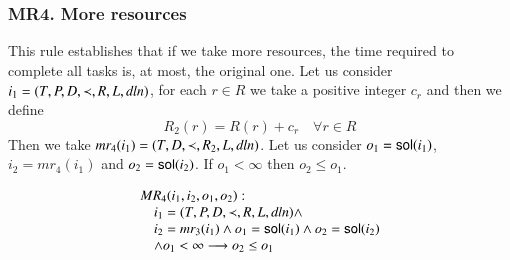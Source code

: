 












\subsubsection{MR4. More resources}
This rule establishes that if we take more resources, the
time required to complete all tasks is, at most, the original one.
Let us consider
$i_{1}=(T, P, D, \prec, R, L, \mathit{dln})$, for each $r\in R$ we take a
positive integer $c_{r}$ and then we define
\begin{displaymath}
  R_{2}(r)=R(r)+c_{r}\quad \forall r\in R
\end{displaymath}
Then we take $mr_{4}(i_{1}) = (T, D, \prec, R_{2}, L, \mathit{dln})$.
Let us
consider $o_{1}=\mathsf{sol}(i_{1})$, $i_{2}=mr_{4}(i_{1})$ and
$o_{2}=\mathsf{sol}(i_{2})$.
If $o_{1}<\infty$ then $o_{2}\leq o_{1}$.

\begin{framed}
  \begin{displaymath}
      \begin{array}{l}
    MR_{4}(i_1,i_2,o_{1},o_{2}):\\
      \hskip 1em  i_1=(T,P,D,\prec,R,L,\mathit{dln}) \wedge\\
      \hskip 1em  i_2=mr_3(i_1)\wedge o_{1}=\mathsf{sol}(i_{1})\wedge o_{2}=\mathsf{sol}(i_2)\\
      \hskip 1em \wedge o_{1}<\infty
      \longrightarrow o_{2}\leq o_1
    \end{array}
  \end{displaymath}
\end{framed}




